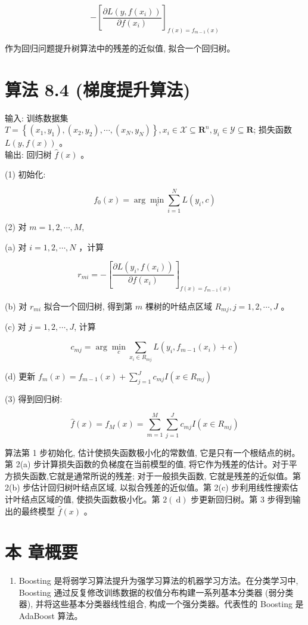 \documentclass[10pt]{article}
\begin{document}
$$
-\left[\frac{\partial L\left(y, f\left(x_{i}\right)\right)}{\partial f\left(x_{i}\right)}\right]_{f(x)=f_{m-1}(x)}
$$

作为回归问题提升树算法中的残差的近似值, 拟合一个回归树。

\section*{算法 8.4 (梯度提升算法)}
输入: 训练数据集 $T=\left\{\left(x_{1}, y_{1}\right),\left(x_{2}, y_{2}\right), \cdots,\left(x_{N}, y_{N}\right)\right\}, x_{i} \in \mathcal{X} \subseteq \boldsymbol{R}^{n}, y_{i} \in \mathcal{Y} \subseteq \boldsymbol{R}$; 损失函数 $L(y, f(x))$ 。\\
输出: 回归树 $\hat{f}(x)$ 。

(1) 初始化:

$$
f_{0}(x)=\arg \min _{c} \sum_{i=1}^{N} L\left(y_{i}, c\right)
$$

(2) 对 $m=1,2, \cdots, M$,

(a) 对 $i=1,2, \cdots, N$ ，计算

$$
r_{m i}=-\left[\frac{\partial L\left(y_{i}, f\left(x_{i}\right)\right)}{\partial f\left(x_{i}\right)}\right]_{f(x)=f_{m-1}(x)}
$$

(b) 对 $r_{m i}$ 拟合一个回归树, 得到第 $m$ 棵树的叶结点区域 $R_{m j}, j=1,2, \cdots, J$ 。

(c) 对 $j=1,2, \cdots, J$, 计算

$$
c_{m j}=\arg \min _{c} \sum_{x_{i} \in R_{m j}} L\left(y_{i}, f_{m-1}\left(x_{i}\right)+c\right)
$$

(d) 更新 $f_{m}(x)=f_{m-1}(x)+\sum_{j=1}^{J} c_{m j} I\left(x \in R_{m j}\right)$

(3) 得到回归树:

$$
\hat{f}(x)=f_{M}(x)=\sum_{m=1}^{M} \sum_{j=1}^{J} c_{m j} I\left(x \in R_{m j}\right)
$$

算法第 1 步初始化, 估计使损失函数极小化的常数值, 它是只有一个根结点的树。第 2(a) 步计算损失函数的负梯度在当前模型的值, 将它作为残差的估计。对于平方损失函数,它就是通常所说的残差; 对于一般损失函数, 它就是残差的近似值。第 2(b) 步估计回归树叶结点区域, 以拟合残差的近似值。第 2(c) 步利用线性搜索估计叶结点区域的值, 使损失函数极小化。第 $2(\mathrm{~d})$ 步更新回归树。第 3 步得到输出的最终模型 $\hat{f}(x)$ 。

\section*{本 章概要}
\begin{enumerate}
  \item Boosting 是将弱学习算法提升为强学习算法的机器学习方法。在分类学习中, Boosting 通过反复修改训练数据的权值分布构建一系列基本分类器 (弱分类器), 并将这些基本分类器线性组合, 构成一个强分类器。代表性的 Boosting 是 AdaBoost 算法。
\end{enumerate}
\end{document}
